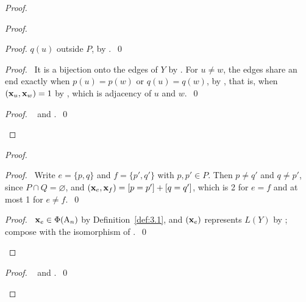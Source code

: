 \begin{proof}
\begin{proof}
\begin{proof}
   $q(u)$ outside $P$, by .~\qed\end{proof}
  \begin{proof}\pf\ It is a bijection onto the edges of $Y$ by . For $u\ne w$,
   the edges share an end exactly when $p(u)=p(w)$ or $q(u)=q(w)$, by , that is,
   when $({\mathbf x}_u,{\mathbf x}_w)=1$ by , which is adjacency of $u$ and
   $w$.~\qed\end{proof}
  \qedstep
  \begin{proof}\pf\  and .~\qed\end{proof}
 \end{proof}
 \begin{proof}
  \begin{proof}\pf\ Write $e=\{p,q\}$ and $f=\{p',q'\}$ with $p,p'\in P$. Then $p\ne q'$ and
   $q\ne p'$, since $P\cap Q=\varnothing$, and $({\mathbf x}_e,{\mathbf x}_f)=[p=p']+[q=q']$, which is 2 for
   $e=f$ and at most 1 for $e\ne f$.~\qed\end{proof}
  \qedstep
  \begin{proof}\pf\ ${\mathbf x}_e\in\Phi(\mathrm{A}_n)$ by Definition~\ref{def:3.1}, and $({\mathbf x}_e)$
   represents $L(Y)$ by ; compose with the isomorphism of
   .~\qed\end{proof}
 \end{proof}
 \qedstep
 \begin{proof}\pf\  and .~\qed\end{proof}
\end{proof}

